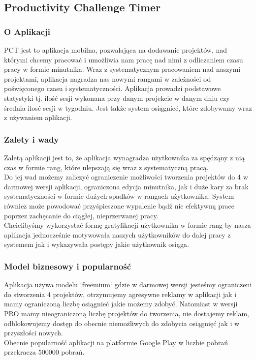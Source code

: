\documentclass[a4paper,11pt]{report}
\begin{document}
\subsection{Productivity Challenge Timer}
\subsubsection{O Aplikacji}
PCT jest to aplikacja mobilna, pozwalająca na dodawanie projektów, nad którymi chcemy pracować i umożliwia nam pracę nad nimi z odliczaniem czasu pracy w formie minutnika. Wraz z systematycznym pracowaniem nad naszymi projektami, aplikacja nagradza nas nowymi rangami w zależności od poświęconego czasu i systematyczności. Aplikacja prowadzi podstawowe statystyki tj. ilość sesji wykonana przy danym projekcie w danym dniu czy średnia ilosć sesji w tygodniu. Jest także system osiągnieć, które zdobywamy wraz z używaniem aplikacji.
\subsubsection{Zalety i wady}
Zaletą aplikacji jest to, że aplikacja wynagradza użytkownika za spędząny z nią czas w formie rang, które ulepszają się wraz z systematyczną pracą. \vspace{0,5cm}\\Do jej wad możemy zaliczyć ograniczenie możliwości tworzenia projektów do 4 w darmowej wersji aplikacji, ograniczona edycja minutnika, jak i duże kary za brak systematyczności w formie dużych spadków w rangach użytkownika. System równiez może powodować przyśpieszone wypalenie bądź nie efektywną prace poprzez zachęcanie do ciągłej, nieprzerwanej pracy.
\vspace{0,5cm}\\Chcielibyśmy wykorzystać formę gratyfikacji użytkownika w formie rang by nasza aplikacja jednocześnie motywowała naszych użytkowników do dalej pracy z systemem jak i wykazywała postępy jakie użytkownik osiąga.
\subsubsection{Model biznesowy i popularność}
Aplikacja używa modelu `freemium` gdzie w darmowej wersji jesteśmy ograniczeni do stworzenia 4 projektów, otrzymujemy agresywne reklamy w aplikacji jak i mamy ograniczoną liczbę osiągnieć jakie możemy zdobyć. Natomiast w wersji PRO mamy nieograniczoną liczbę projektów do tworzenia, nie dostajemy reklam, odblokowujemy dostęp do obecnie niemożliwych do zdobycia osiągnięć jak i w przyszłości nowych.\vspace{0,5cm}\\
Obecnie popularność aplikacji na platformie Google Play w liczbie pobrań przekracza 500000 pobrań.
\end{document}
